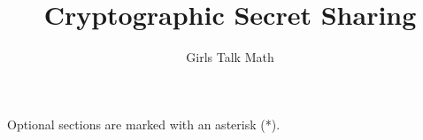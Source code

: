 \documentclass[12 pt]{article}
\title{Cryptographic Secret Sharing}
\author{Girls Talk Math}
\date{}
\begin{document}
\maketitle
\vskip 1in


\newpage
\tableofcontents
\vspace*{\fill}
Optional sections are marked with an asterisk (*).

\newpage

\newpage

\newpage

\newpage


\newpage
{\small


}
\end{document}

